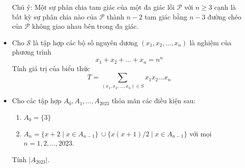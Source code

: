 \documentclass[11pt]{scrartcl}
\begin{document}
\begin{itemize}[label=, leftmargin=0em, itemsep=-0em]
\begin{btvn}
Chú ý: Một sự phân chia tam giác của một đa giác lồi $\mathcal{P}$ với $n \ge 3$ cạnh là bất kỳ sự phân chia nào của $\mathcal{P}$ thành $n-2$ tam giác bằng $n-3$ đường chéo của $\mathcal{P}$ không giao nhau bên trong đa giác.
        
    \end{btvn}
    \item \begin{btvn}
        Cho $\mathcal{S}$ là tập hợp các bộ số nguyên dương $(x_1,x_2,\dots,x_n)$ là nghiệm của phương trình
    \[
        x_1 + x_2 +\dots+x_n = n^n
    \]
    Tính giá trị của biểu thức
    \[
        T=\sum_{(x_1,x_2,\dots,x_n) \in S}x_1x_2\dots x_n 
    \]
    \end{btvn}

    \item \begin{btvn}
        Cho các tập hợp $A_0, A_1, \dots, A_{2023}$ thỏa mãn các điều kiện sau:
        \begin{enumerate}
            \item $A_0 = \{ 3 \}$
            \item $A_n = \{ x + 2 \mid x \in A_{n -     1} \} \ \cup \{x(x+1) / 2 \mid x \in A_{n - 1} \}$ với mọi $n = 1, 2, \dots, 2023$.
        \end{enumerate}
    Tính $|A_{2023}|$.  
    \end{btvn}


\end{itemize}
\end{document}
